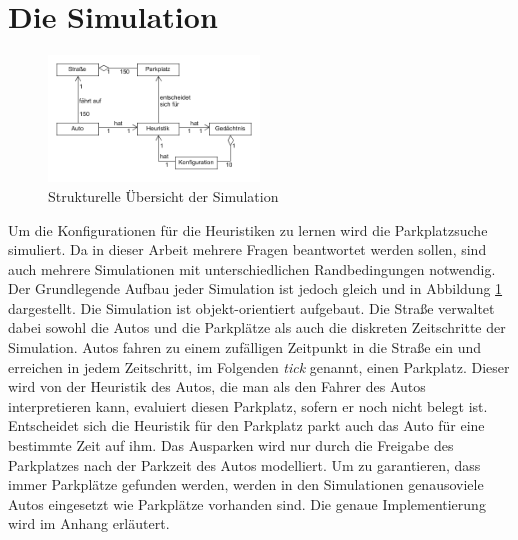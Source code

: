 \section{Die Simulation}
\begin{figure}
\includegraphics[width=0.5\textwidth]{uml/simOverview.png}
\caption{Strukturelle Übersicht der Simulation}\label{fig_simOver}
\end{figure}
Um die Konfigurationen für die Heuristiken zu lernen wird die Parkplatzsuche simuliert. Da in dieser Arbeit mehrere Fragen beantwortet werden sollen, sind auch mehrere Simulationen mit unterschiedlichen Randbedingungen notwendig. Der Grundlegende Aufbau jeder Simulation ist jedoch gleich und in Abbildung \ref{fig_simOver} dargestellt. Die Simulation ist objekt-orientiert aufgebaut. Die Straße verwaltet dabei sowohl die Autos und die Parkplätze als auch die diskreten Zeitschritte der Simulation. Autos fahren zu einem zufälligen Zeitpunkt in die Straße ein und erreichen in jedem Zeitschritt, im Folgenden \emph{tick} genannt, einen Parkplatz. Dieser wird von der Heuristik des Autos, die man als den Fahrer des Autos interpretieren kann, evaluiert diesen Parkplatz, sofern er noch nicht belegt ist. Entscheidet sich die Heuristik für den Parkplatz parkt auch das Auto für eine bestimmte Zeit auf ihm. Das Ausparken wird nur durch die Freigabe des Parkplatzes nach der Parkzeit des Autos modelliert. Um zu garantieren, dass immer Parkplätze gefunden werden, werden in den Simulationen genausoviele Autos eingesetzt wie Parkplätze vorhanden sind. Die genaue Implementierung wird im Anhang erläutert.

